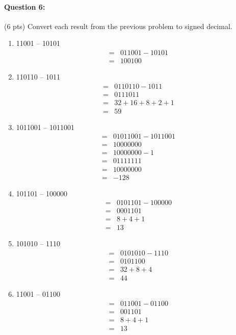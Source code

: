\documentclass[12pt,letterpaper,titlepage]{report}
\begin{document}
\begin{raggedright}
\paragraph{Question 6:}
(6 pts) Convert each result from the previous problem to signed decimal. 
\begin{multicols}{2}
\begin{enumerate} [label=\alph*)]
\item 11001 – 10101
\begin{align*}
  =& 011001 - 10101
\\=& 100100
\end{align*}
\item 110110 – 1011
\begin{align*}
  =& 0110110 - 1011
\\=& 0111011
\\=& 32+16+8+2+1
\\=& 59
\end{align*}
\item 1011001 – 1011001
\begin{align*}
  =& 01011001 - 1011001
\\=& 10000000
\\=& 10000000 - 1
\\=& 01111111
\\=& 10000000
\\=& -128
\end{align*}
\item 101101 – 100000
\begin{align*}
  =& 0101101 - 100000
\\=& 0001101
\\=& 8+4+1
\\=& 13
\end{align*}
\item 101010 – 1110
\begin{align*}
  =& 0101010 - 1110
\\=& 0101100
\\=& 32+8+4
\\=& 44
\end{align*}
\item 11001 – 01100
\begin{align*}
  =& 011001 - 01100
\\=& 001101
\\=& 8+4+1
\\=& 13
\end{align*}
\end{enumerate}

\end{multicols}


\end{raggedright}
\end{document}
